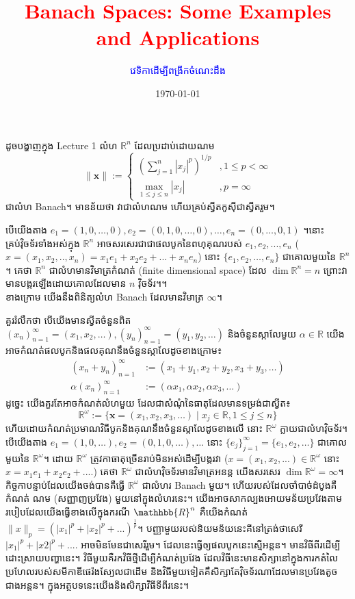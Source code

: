 \documentclass[12pt]{article}
\title{\textcolor{red}{\en Banach Spaces: Some Examples and Applications}}
\author{\textcolor{blue}{វេទិកាដើម្បីពង្រីកចំណេះដឹង}}
\date{\today}
\theoremstyle{definition}
\begin{document}
\maketitle
\Large
ដូចបង្ហាញក្នុង Lecture 1 លំហ $\mathbb{R}^n$ ដែលប្រដាប់ដោយណម
\[\|\mathbf{x}\|:=
\begin{cases}
\left(\displaystyle \sum_{j=1}^n|x_j|^p\right)^{1/p} & ,1\le p<\infty\\
\displaystyle\max_{1\le j\le n}|x_j| & ,p=\infty
\end{cases}
\]
ជាលំហ Banach។ មានន័យថា វាជាលំហណម ហើយគ្រប់ស្វីតកូស៊ីជាស្វីតរួម។

បើយើងតាង $e_1=(1,0,\dots,0),e_2=(0,1,0,\dots,0),\dots,e_n=(0,\dots,0,1)$ ។នោះគ្រប់វុិចទ័រទាំងអស់ក្នុង ${\mathbb{R}}^n$ អាចសរសេរជាជាផលបូកនៃពហុគុណរបស់ $e_1,e_2,...,e_n$ ($x=(x_1,x_2,..,x_n)=x_1e_1+x_2e_2+...+x_ne_n$) នោះ $\{e_1,e_2,\dots,e_n\}$ ជាគោលមួយនៃ $\mathbb{R}^n$។ គេថា
$\mathbb{R}^n$ ជាលំហមានវិមាត្រកំណត់ (finite dimensional space) ដែល $\dim \mathbb{R}^n=n$ ព្រោះវាមានបង្ករឡើងដោយគោលដែលមាន $n$ វុិចទ័រ។។\\ 
ខាងក្រោម យើងនឹងពិនិត្យលំហ Banach ដែលមានវិមាត្រ $\infty$។

គួររំលឹកថា បើយើងមានស្វីតចំនួនពិត $(x_n)_{n=1}^{\infty}=(x_1,x_2,\dots),(y_n)_{n=1}^{\infty}=(y_1,y_2,\dots)$ និងចំនួនស្កាលែមួយ $\alpha\in\mathbb{R}$ យើងអាចកំណត់ផលបូកនិងផលគុណនឹងចំនួនស្កាលែដូចខាងក្រោម៖
\begin{align*}
    (x_n+y_n)_{n=1}^{\infty}&:=(x_1+y_1,x_2+y_2,x_3+y_3,\dots)\\
    \alpha (x_n)_{n=1}^{\infty}&:=(\alpha x_1,\alpha x_2,\alpha x_3,\dots)
\end{align*}
ដូច្នេះ យើងគួរតែអាចកំណត់លំហមួយ ដែលជាសំណំុនៃធាតុដែលមានទម្រង់ជាស្វីត៖
\[\mathbb{R}^{\omega}:=\{\mathbf{x}=(x_1,x_2,x_3,\dots)\mid x_j\in \mathbb{R},1\le j\le n\}
\]
ហើយដោយកំណត់ប្រមាណវិធីបូកនិងគុណនឹងចំនួនស្កាលែដូចខាងលើ នោះ $\mathbb{R}^{\omega}$ ក្លាយជាលំហវុិចទ័រ។ បើយើងតាង $e_1=(1,0,\dots),e_2=(0,1,0,\dots),\dots$ នោះ $\{e_j\}_{j=1}^{\infty}=\{e_1,e_2,\dots\}$ ជាគោលមួយនៃ $\mathbb{R}^{\omega}$។ ដោយ ${\mathbb{R}}^{\omega}$ ត្រូវកាធាតុច្រើនរាប់មិនអស់ដើម្បីបង្ករវា ($x=(x_1,x_2,...) \in {\mathbb{R}}^{\omega}$ នោះ $x=x_1e_1+x_2e_2+....$)  គេថា $\mathbb{R}^{\omega}$  ជាលំហវុិចទ័រមានវិមាត្រអនន្ត  យើងសរសេរ $\dim \mathbb{R}^{\omega}=\infty$។
កិច្ចកាបន្ទាប់ដែលយើងចង់បានគឺធ្វើ $\mathbb{R}^{\omega}$ ជាលំហរ Banach មួយ។ ហើយរបស់ដែលចាំបាច់ដំបូងគឺកំណត់ ណម (សញ្ញាញប្រវែង) មួយនៅក្នុងលំហរនេះ។ យើងអាចសាកល្បងអោយមន័យប្រវែងតាមរបៀបដែលយើងធ្វើខាងលើក្នុងករណី ${\mathhbb{R}}^{n}$ គឺយើងកំណត់ $\|x\|_p={(|x_1|^p+|x_2|^p+...)}^{\frac{1}{p}}$។ បញ្ញាមួយរបស់និយមន័យនេះគីនៅត្រង់ថាសេរី $|x_1|^p+|x2|^p+....$ អាចមិនមែនជាសេរីរួម។ ដែលនេះធ្វើឲ្យផលបូកនេះស្មើអន្តន។ មានវិធីពីរដើម្បីដោះស្រាយបញ្ហានេះ។ វិធីមួយគឺរកវិធីថ្មីដើម្បីកំណត់ប្រវែង ដែលវិធីនេះមានសិក្សានៅក្នុងការកតំលៃប្រហែលរបស់សមីកាឌីផេរ៉ងស្យែលជាដើម និងវិធីមួយទៀតគឺសិក្សាតែវុិចទ័រណាដែលមានប្រវែងតូចជាងអន្តន។ ក្នុងអត្ថបទនេះយើងនិងសិក្សាវិធីទីពីរនេះ។
\end{document}
